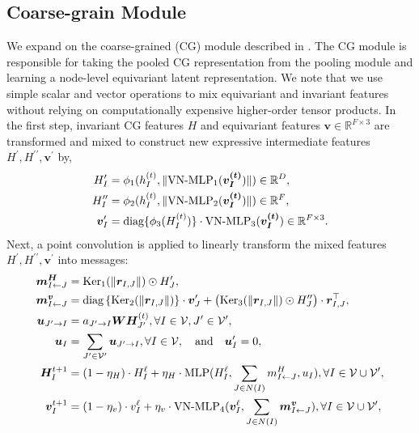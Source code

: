 \subsection{Coarse-grain Module}
\label{section:eqn-coarse}
We expand on the coarse-grained (CG) module described in . The CG module is responsible for taking the pooled CG representation from the pooling module and learning a node-level equivariant latent representation.
We note that we use simple scalar and vector operations to mix equivariant and invariant features without relying on computationally expensive higher-order tensor products.
In the first step, invariant CG features $H$ and equivariant features $\bm{v}\in\mathbb{R}^{F\times 3}$ are transformed and mixed to construct new expressive intermediate features $H^{\prime}, H^{\prime\prime}, \bm{v}^{\prime}$ by,
\begin{subequations}
\begin{align}
H^{\prime}_I &= \phi_{1}(h^{(t)}_I, \lVert\text{VN-MLP}_{1}(\bm{v^{(t)}_I})\rVert)\in\mathbb{R}^{D} \label{eqn-a},\\ 
H^{\prime\prime}_I&=\phi_{2}(h^{(t)}_I, \lVert\text{VN-MLP}_{2}(\bm{v^{(t)}_I})\rVert)\in\mathbb{R}^{F}\label{eqn-b},\\
\bm{v}^{\prime}_I &=\text{diag}\{\phi_{3}(H^{(t)}_I)\}\cdot\text{VN-MLP}_{3}(\bm{v^{(t)}_I})\in \mathbb{R}^{F\times 3}.\label{eqn-c}
\end{align}
\label{mixed features}
\end{subequations}
Next, a point convolution \citep{tensor-field-network, painn, 3dlinker} is applied to linearly transform the mixed features $H^{\prime},H^{\prime\prime},\bm{v}^{\prime}$ into messages:
\begin{subequations}
\begin{align}
\bm{m^H}_{I\leftarrow J} &= \text{Ker}_{1}(\lVert\bm{r}_{I,J}\rVert)\odot H^{\prime}_J\label{eqn-d}, \\
\bm{m^v}_{I\leftarrow J}&=  \text{diag}\left\{\text{Ker}_{2}(\lVert\bm{r}_{I,J}\rVert)\right\} \cdot \bm{v}^{\prime}_J  +\big(\text{Ker}_{3}(\lVert\bm{r}_{I,J}\rVert)\odot H^{\prime\prime}_{J}\big)\cdot\bm{r}^{\top}_{I,J}\label{eqn-e}, \\
\bm{u}_{J'\to I} &= a_{J'\to I} \bm{W} \bm{H}_{J'}^{(t)},\forall I\in{\mathcal{V}},J'\in{\mathcal{V}}', \\
\bm{u}_{I} &=  \sum_{J'\in{\mathcal{V}}'}\bm{u}_{J'\to I},\forall I \in{\mathcal{V}}, \quad \text{and} \quad \bm{u}'_{I} =  0, \\
\bm{H}^{t+1}_{I}& = (1 - \eta_H) \cdot H^{\ell}_I+ \eta_H \cdot\text{MLP}(H^{\ell}_I, \sum_{J\in N(I)}m^H_{I\leftarrow J}, u_{I}),\forall I\in{\mathcal{V}}\cup{\mathcal{V}}' \label{agg-h},\\
\bm{v}^{t+1}_{I} &= (1 - \eta_v) \cdot v^{\ell}_I + \eta_v \cdot \text{VN-MLP}_{4}(\bm{v}^{\ell}_I, \sum_{J\in N(I)}\bm{m^v}_{I\leftarrow J}),\forall I\in{\mathcal{V}}\cup{\mathcal{V}}'\label{agg-v},
\end{align}
\label{message function}
\end{subequations}
